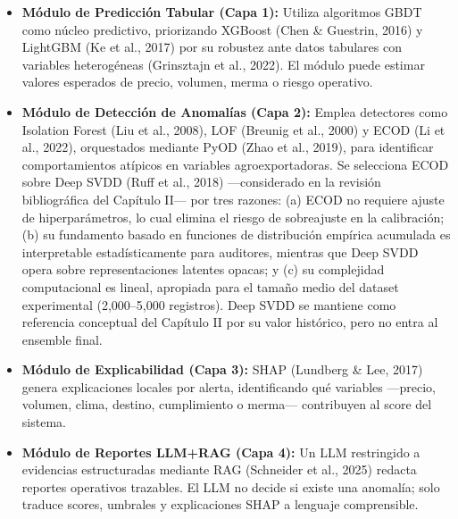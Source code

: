\begin{itemize}
\tightlist
\item
  \textbf{Módulo de Predicción Tabular (Capa 1):} Utiliza algoritmos
  GBDT como núcleo predictivo, priorizando XGBoost (Chen \& Guestrin,
  2016) y LightGBM (Ke et al., 2017) por su robustez ante datos
  tabulares con variables heterogéneas (Grinsztajn et al., 2022). El
  módulo puede estimar valores esperados de precio, volumen, merma o
  riesgo operativo.
\item
  \textbf{Módulo de Detección de Anomalías (Capa 2):} Emplea detectores
  como Isolation Forest (Liu et al., 2008), LOF (Breunig et al., 2000) y
  ECOD (Li et al., 2022), orquestados mediante PyOD (Zhao et al., 2019),
  para identificar comportamientos atípicos en variables
  agroexportadoras. Se selecciona ECOD sobre Deep SVDD (Ruff et al.,
  2018) ---considerado en la revisión bibliográfica del Capítulo II---
  por tres razones: (a) ECOD no requiere ajuste de hiperparámetros, lo
  cual elimina el riesgo de sobreajuste en la calibración; (b) su
  fundamento basado en funciones de distribución empírica acumulada es
  interpretable estadísticamente para auditores, mientras que Deep SVDD
  opera sobre representaciones latentes opacas; y (c) su complejidad
  computacional es lineal, apropiada para el tamaño medio del dataset
  experimental (2,000--5,000 registros). Deep SVDD se mantiene como
  referencia conceptual del Capítulo II por su valor histórico, pero no
  entra al ensemble final.
\item
  \textbf{Módulo de Explicabilidad (Capa 3):} SHAP (Lundberg \& Lee,
  2017) genera explicaciones locales por alerta, identificando qué
  variables ---precio, volumen, clima, destino, cumplimiento o merma---
  contribuyen al score del sistema.
\item
  \textbf{Módulo de Reportes LLM+RAG (Capa 4):} Un LLM restringido a
  evidencias estructuradas mediante RAG (Schneider et al., 2025) redacta
  reportes operativos trazables. El LLM no decide si existe una
  anomalía; solo traduce scores, umbrales y explicaciones SHAP a
  lenguaje comprensible.
\end{itemize}

